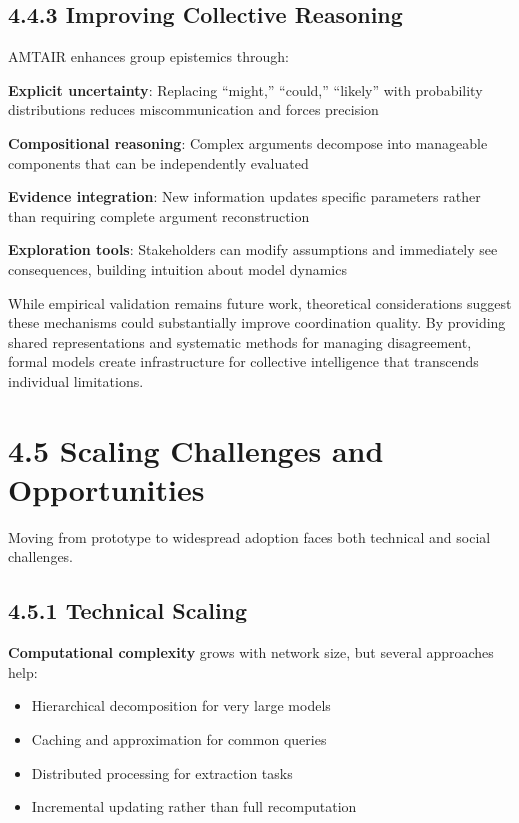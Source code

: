 \documentclass[
  11pt,
  letterpaper,
  openany]{book}
\providecommand{\tightlist}{%
  \setlength{\itemsep}{0pt}\setlength{\parskip}{0pt}}
\begin{document}
\subsection{4.4.3 Improving Collective
Reasoning}\label{sec-collective-reasoning}

AMTAIR enhances group epistemics through:

\textbf{Explicit uncertainty}: Replacing ``might,'' ``could,''
``likely'' with probability distributions reduces miscommunication and
forces precision

\textbf{Compositional reasoning}: Complex arguments decompose into
manageable components that can be independently evaluated

\textbf{Evidence integration}: New information updates specific
parameters rather than requiring complete argument reconstruction

\textbf{Exploration tools}: Stakeholders can modify assumptions and
immediately see consequences, building intuition about model dynamics

While empirical validation remains future work, theoretical
considerations suggest these mechanisms could substantially improve
coordination quality. By providing shared representations and systematic
methods for managing disagreement, formal models create infrastructure
for collective intelligence that transcends individual limitations.

\section{4.5 Scaling Challenges and Opportunities}\label{sec-scaling}

Moving from prototype to widespread adoption faces both technical and
social challenges.

\subsection{4.5.1 Technical Scaling}\label{sec-technical-scaling}

\textbf{Computational complexity} grows with network size, but several
approaches help:

\begin{itemize}
\tightlist
\item
  Hierarchical decomposition for very large models
\item
  Caching and approximation for common queries
\item
  Distributed processing for extraction tasks
\item
  Incremental updating rather than full recomputation
\end{itemize}
\end{document}
